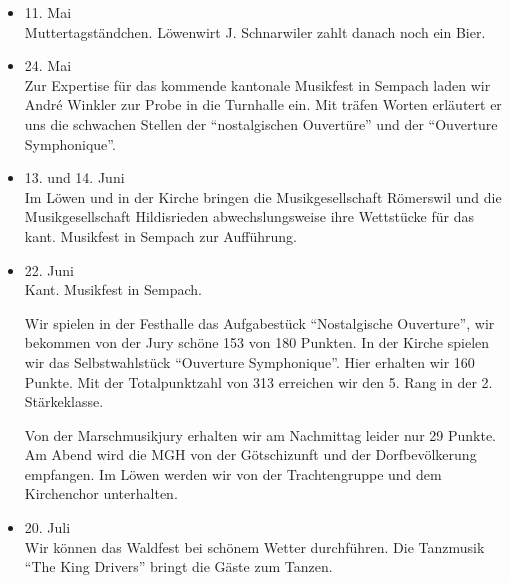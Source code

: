 \begin{history}
\begin{itemize}
        \item 11. Mai\\
              Muttertagständchen. Löwenwirt J. Schnarwiler zahlt danach noch ein Bier.

        \item 24. Mai\\
              Zur Expertise für das kommende kantonale Musikfest in Sempach laden wir
              André Winkler zur Probe in die Turnhalle ein. Mit träfen Worten
              erläutert er uns die schwachen Stellen der \enquote{nostalgischen Ouvertüre}
              und der \enquote{Ouverture Symphonique}.

        \item 13. und 14. Juni\\
              Im Löwen und in der Kirche bringen die Musikgesellschaft Römerswil und
              die Musikgesellschaft Hildisrieden abwechslungsweise ihre Wettstücke für
              das kant. Musikfest in Sempach zur Aufführung.

        \item 22. Juni\\
              Kant. Musikfest in Sempach.

              Wir spielen in der Festhalle das Aufgabestück \enquote{Nostalgische
                  Ouverture}, wir bekommen von der Jury schöne 153 von 180 Punkten. In
              der Kirche spielen wir das Selbstwahlstück \enquote{Ouverture
                  Symphonique}. Hier erhalten wir 160 Punkte. Mit der Totalpunktzahl
              von 313 erreichen wir den 5. Rang in der 2. Stärkeklasse.

              Von der Marschmusikjury erhalten wir am Nachmittag leider nur 29 Punkte.
              Am Abend wird die MGH von der Götschizunft und der Dorfbevölkerung
              empfangen. Im Löwen werden wir von der Trachtengruppe und dem
              Kirchenchor unterhalten.

        \item 20. Juli\\
              Wir können das Waldfest bei schönem Wetter durchführen. Die Tanzmusik
              \enquote{The King Drivers} bringt die Gäste zum Tanzen.



    \end{itemize}

\end{history}
